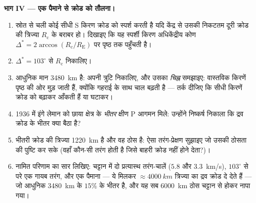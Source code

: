 \begin{problem}[{सप्ताहांत समस्या --- भूकंपों ने द्रव क्रोड कैसे
उजागर किया}]
\medskip\noindent\textbf{भाग IV --- एक पैमाने से क्रोड को तौलना।}
\begin{enumerate}[resume]
  \item स्रोत से चली कोई सीधी S किरण क्रोड को स्पर्श करती है यदि
        केंद्र से उसकी निकटतम दूरी क्रोड की त्रिज्या
        $R_{\text{c}}$ के बराबर हो। दिखाइए कि यह स्पर्शी किरण
        अधिकेंद्रीय कोण $\Delta^* =
        2\arccos(R_{\text{c}}/R_{\text{E}})$ पर पृष्ठ तक पहुँचती है।
  \item $\Delta^* = 103^\circ$ से $R_{\text{c}}$ निकालिए।
  \item आधुनिक मान \qty{3480}{km} है: अपनी त्रुटि निकालिए, और उसका
        \emph{चिह्न} समझाइए: वास्तविक किरणें पृष्ठ की ओर मुड़ जाती हैं,
        क्योंकि गहराई के साथ चाल बढ़ती है --- तर्क दीजिए कि सीधी
        किरणें क्रोड को बढ़ाकर आँकती हैं या घटाकर।
  \item 1936 में इंगे लेमान को छाया क्षेत्र के \emph{भीतर} क्षीण
        P आगमन मिले: उन्होंने निष्कर्ष निकाला कि द्रव क्रोड के भीतर
        क्या बैठा है?
  \item भीतरी क्रोड की त्रिज्या \qty{1220}{km} है और वह ठोस है:
        ऐसा तरंग-प्रेक्षण सुझाइए जो उसकी ठोसता की पुष्टि कर सके
        (वहाँ कौन-सी तरंग होती है जिसे बाहरी क्रोड नहीं होने देता?)।
  \item नामित परिणाम का सार लिखिए: चट्टान में दो प्रत्यास्थ तरंग-चालें
        ($5.8$ और \qty{3.3}{km/s}), $103^\circ$ से परे एक गायब तरंग,
        और एक पैमाना --- ये मिलकर $\approx \qty{4000}{km}$ त्रिज्या
        का द्रव क्रोड दे देते हैं --- जो आधुनिक \qty{3480}{km} के
        $15\%$ के भीतर है, और यह सब \qty{6000}{km} ठोस चट्टान से होकर
        नापा गया।
\end{enumerate}
\end{problem}
